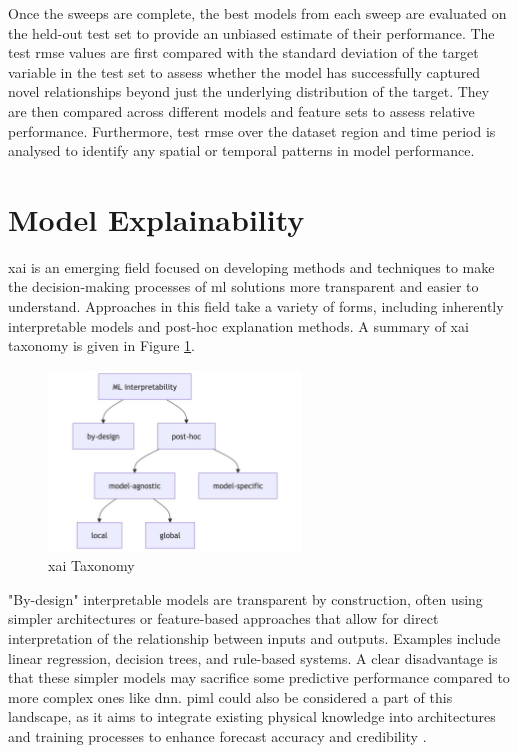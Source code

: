 Once the sweeps are complete, the best models from each sweep are evaluated on the held-out test set to provide an unbiased estimate of their performance. The test \acrshort{rmse} values are first compared with the standard deviation of the target variable in the test set to assess whether the model has successfully captured novel relationships beyond just the underlying distribution of the target. They are then compared across different models and feature sets to assess relative performance. Furthermore, test \acrshort{rmse} over the dataset region and time period is analysed to identify any spatial or temporal patterns in model performance.

\section{Model Explainability}
\label{sec:model-explainability}

\acrfull{xai} is an emerging field focused on developing methods and techniques to make the decision-making processes of \acrshort{ml} solutions more transparent and easier to understand. Approaches in this field take a variety of forms, including inherently interpretable models and post-hoc explanation methods. A summary of \acrshort{xai} taxonomy is given in Figure \ref{fig:xai-taxonomy}.

\begin{figure}[ht]
    \centering
    \includegraphics[width=0.6\textwidth]{../figures/static/xai-taxonomy.jpg}
    \caption{\acrshort{xai} Taxonomy \citep{Molnar2025}}
    \label{fig:xai-taxonomy}
\end{figure}

"By-design" interpretable models are transparent by construction, often using simpler architectures or feature-based approaches that allow for direct interpretation of the relationship between inputs and outputs. Examples include linear regression, decision trees, and rule-based systems. A clear disadvantage is that these simpler models may sacrifice some predictive performance compared to more complex ones like \acrfull{dnn}. \acrfull{piml} could also be considered a part of this landscape, as it aims to integrate existing physical knowledge into architectures and training processes to enhance forecast accuracy and credibility \citep{Luo2025,Pathak2022}. 

